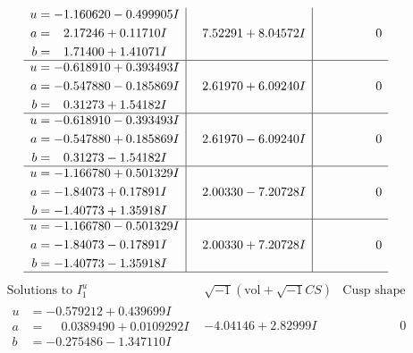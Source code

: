 \documentclass[1p]{elsarticle_modified}
\theoremstyle{definition}
\newcommand{\I}{\sqrt{-1}}
\begin{document}
$$\begin{array}{c|c|c}
\begin{aligned}
u &= -1.160620 - 0.499905 I \\
a &= \phantom{-}2.17246 + 0.11710 I \\
b &= \phantom{-}1.71400 + 1.41071 I\end{aligned}
 & \phantom{-}7.52291 + 8.04572 I & \phantom{-0.000000 } 0 \\ \hline\begin{aligned}
u &= -0.618910 + 0.393493 I \\
a &= -0.547880 - 0.185869 I \\
b &= \phantom{-}0.31273 + 1.54182 I\end{aligned}
 & \phantom{-}2.61970 + 6.09240 I & \phantom{-0.000000 } 0 \\ \hline\begin{aligned}
u &= -0.618910 - 0.393493 I \\
a &= -0.547880 + 0.185869 I \\
b &= \phantom{-}0.31273 - 1.54182 I\end{aligned}
 & \phantom{-}2.61970 - 6.09240 I & \phantom{-0.000000 } 0 \\ \hline\begin{aligned}
u &= -1.166780 + 0.501329 I \\
a &= -1.84073 + 0.17891 I \\
b &= -1.40773 + 1.35918 I\end{aligned}
 & \phantom{-}2.00330 - 7.20728 I & \phantom{-0.000000 } 0 \\ \hline\begin{aligned}
u &= -1.166780 - 0.501329 I \\
a &= -1.84073 - 0.17891 I \\
b &= -1.40773 - 1.35918 I\end{aligned}
 & \phantom{-}2.00330 + 7.20728 I & \phantom{-0.000000 } 0\\
 \hline 
 \end{array}$$\newpage$$\begin{array}{c|c|c}  
\text{Solutions to }I^u_{1}& \I (\text{vol} + \sqrt{-1}CS) & \text{Cusp shape}\\
 \hline 
\begin{aligned}
u &= -0.579212 + 0.439699 I \\
a &= \phantom{-}0.0389490 + 0.0109292 I \\
b &= -0.275486 - 1.347110 I\end{aligned}
 & -4.04146 + 2.82999 I & \phantom{-0.000000 } 0 \\ \hline\begin{aligned}

\end{aligned}
\end{array}$$
\end{document}
